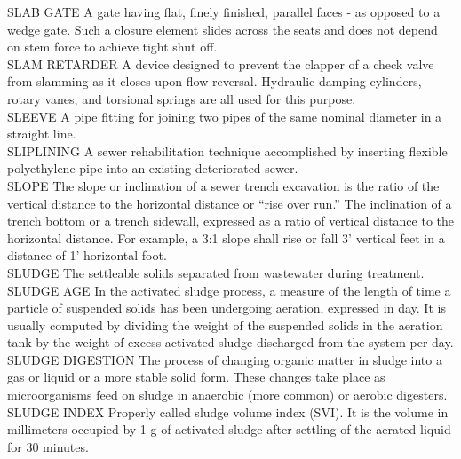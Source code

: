 SLAB GATE
A gate having flat, finely finished, parallel faces - as opposed to a wedge gate. Such a closure element slides across the seats and does not depend on stem force to achieve tight shut off.
\vspace{0.3cm}\\
SLAM RETARDER
A device designed to prevent the clapper of a check valve from slamming as it closes upon flow reversal. Hydraulic damping cylinders, rotary vanes, and torsional springs are all used for this purpose.
\vspace{0.3cm}\\
SLEEVE
A pipe fitting for joining two pipes of the same nominal diameter in a straight line. 
\vspace{0.3cm}\\
SLIPLINING
A sewer rehabilitation technique accomplished by inserting flexible polyethylene pipe into an existing deteriorated sewer. 
\vspace{0.3cm}\\
SLOPE
The slope or inclination of a sewer trench excavation is the ratio of the vertical distance to the horizontal distance or “rise over run.” The inclination of a trench bottom or a trench sidewall, expressed as a ratio of vertical distance to the horizontal distance. For example, a 3:1 slope shall rise or fall 3’ vertical feet in a distance of 1’ horizontal foot. 
\vspace{0.3cm}\\
SLUDGE
The settleable solids separated from wastewater during treatment.
\vspace{0.3cm}\\
SLUDGE AGE
In the activated sludge process, a measure of the length of time a particle of suspended solids has been undergoing aeration, expressed in day. It is usually computed by dividing the weight of the suspended solids in the aeration tank by the weight of excess activated sludge discharged from the system per day.
\vspace{0.3cm}\\
SLUDGE DIGESTION
The process of changing organic matter in sludge into a gas or liquid or a more stable solid form. These changes take place as microorganisms feed on sludge in anaerobic (more common) or aerobic digesters.
\vspace{0.3cm}\\
SLUDGE INDEX
Properly called sludge volume index (SVI). It is the volume in millimeters occupied by 1 g of activated sludge after settling of the aerated liquid for 30 minutes.
\vspace{0.3cm}\\
